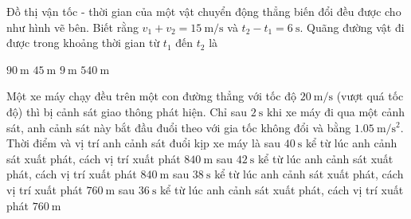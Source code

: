 \begin{ex}
	Đồ thị vận tốc - thời gian của một vật chuyển động thẳng biến đổi đều được cho như hình vẽ bên. Biết rằng $v_1+v_2=\SI{15}{\meter/\second}$ và $t_2-t_1=\SI{6}{\second}$. Quãng đường vật đi được trong khoảng thời gian từ $t_1$ đến $t_2$ là
	\begin{center}
	\end{center}	
	\choice
	{$\SI{90}{\meter}$}
	{\True $\SI{45}{\meter}$}
	{$\SI{9}{\meter}$}
	{$\SI{540}{\meter}$}
	\loigiai{}
\end{ex}
\begin{ex}
	Một xe máy chạy đều trên một con đường thẳng với tốc độ $\SI{20}{\meter/\second}$ (vượt quá tốc độ) thì bị cảnh sát giao thông phát hiện. Chỉ sau $\SI{2}{\second}$ khi xe máy đi qua một cảnh sát, anh cảnh sát này bắt đầu đuổi theo với gia tốc không đổi và bằng $\SI{1.05}{\meter/\second^2}$. Thời điểm và vị trí anh cảnh sát đuổi kịp xe máy là
	\choice
	{\True sau $\SI{40}{\second}$ kể từ lúc anh cảnh sát xuất phát, cách vị trí xuất phát $\SI{840}{\meter}$}
	{sau $\SI{42}{\second}$ kể từ lúc anh cảnh sát xuất phát, cách vị trí xuất phát $\SI{840}{\meter}$}
	{sau $\SI{38}{\second}$ kể từ lúc anh cảnh sát xuất phát, cách vị trí xuất phát $\SI{760}{\meter}$}
	{sau $\SI{36}{\second}$ kể từ lúc anh cảnh sát xuất phát, cách vị trí xuất phát $\SI{760}{\meter}$}
	\loigiai{}
\end{ex}
